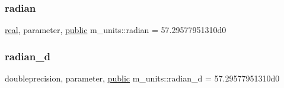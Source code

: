 \mbox{\label{namespacem__units_ae9442f0901c0238170aff7cf946fb0c1}} 
\subsubsection{\texorpdfstring{radian}{radian}}
{\footnotesize\ttfamily \hyperlink{read__watch_83_8txt_abdb62bde002f38ef75f810d3a905a823}{real}, parameter, \hyperlink{M__stopwatch_83_8txt_a2f74811300c361e53b430611a7d1769f}{public} m\+\_\+units\+::radian = 57.\+29577951310d0}

\mbox{\label{namespacem__units_ae88c8fb74ff03da879e668cfe0635550}} 
\subsubsection{\texorpdfstring{radian\+\_\+d}{radian\_d}}
{\footnotesize\ttfamily doubleprecision, parameter, \hyperlink{M__stopwatch_83_8txt_a2f74811300c361e53b430611a7d1769f}{public} m\+\_\+units\+::radian\+\_\+d = 57.\+29577951310d0}

